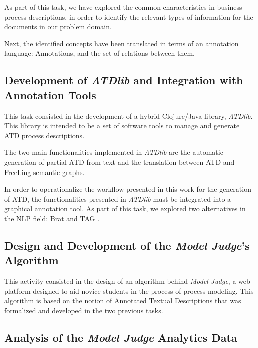 As part of this task, we have explored the common characteristics in business
process descriptions, in order to identify the relevant types of information for
the documents in our problem domain.

Next, the identified concepts have been translated in terms of an annotation
language: Annotations, and the set of relations between them. 


\subsection*{Development of \emph{ATDlib} and Integration with Annotation Tools}

This task consisted in the development of a hybrid Clojure/Java library, \emph{ATDlib}.
This library is intended to be a set of software tools to manage and generate
ATD process descriptions.

The two main functionalities implemented in \emph{ATDlib} are the automatic
generation of partial ATD from text and the translation between ATD and
FreeLing \cite{PadroS12} semantic graphs.

In order to operationalize the workflow presented in this work for the
generation of ATD, the functionalities presented in \emph{ATDlib} must be
integrated into a graphical annotation tool. As part of this task, we explored
two alternatives in the NLP field: Brat \cite{stenetorp2012brat} and TAG
 \cite{DBLP:journals/corr/abs-1711-00529}.

\subsection*{Design and Development of the \emph{Model Judge}'s Algorithm}

This activity consisted in the design of an algorithm behind \emph{Model Judge},
a web platform designed to aid novice students in the process of process
modeling. This algorithm is based on the notion of Annotated Textual
Descriptions that was formalized and developed in the two previous tasks.

\subsection*{Analysis of the \emph{Model Judge} Analytics Data}

